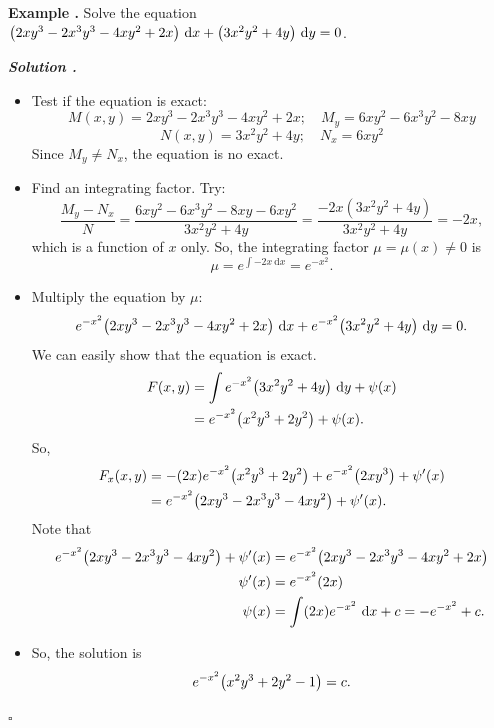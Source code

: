 \documentclass[12pt, a4paper]{article}
\newcounter{index}[subsection]
\newenvironment*{eg}{\begin{framed}\par\noindent\textbf{Example \thesubsection.\stepcounter{index}\theindex}}{\par\end{framed}}
\newcounter{nprf}[subsection]
\newenvironment*{sol}{\par\indent\textbf{\textit{Solution \stepcounter{nprf}\thenprf.}}\par}{\hfill{$\square$}\par}
\def\d{{\mathrm{d}}}
\begin{document}
\begin{eg}
	Solve the equation $\qty(2xy^3-2x^3y^3-4xy^2+2x)\ \d{x}+\qty(3x^2y^2+4y)\ \d{y}=0$.
	\begin{sol}
		\begin{itemize}
			\item Test if the equation is exact: \[M(x,y)=2xy^3-2x^3y^3-4xy^2+2x;\quad M_y=6xy^2-6x^3y^2-8xy\]\[N(x,y)=3x^2y^2+4y;\quad N_x=6xy^2\] Since $M_y\neq N_x$, the equation is no exact.
			\item Find an integrating factor. Try: \[\dfrac{M_y-N_x}{N}=\dfrac{6xy^2-6x^3y^2-8xy-6xy^2}{3x^2y^2+4y}=\dfrac{-2x(3x^2y^2+4y)}{3x^2y^2+4y}=-2x,\] which is a function of $x$ only. So, the integrating factor $\mu=\mu(x)\neq0$ is \[\mu=e^{\int-2x\ \d{x}}=e^{-x^2}.\]
			\item Multiply the equation by $\mu$: \[e^{-x^2}\qty(2xy^3-2x^3y^3-4xy^2+2x)\ \d{x}+e^{-x^2}\qty(3x^2y^2+4y)\ \d{y}=0.\] We can easily show that the equation is exact. \begin{align*}F(x,y)&=\int e^{-x^2}\qty(3x^2y^2+4y)\ \d{y}+\psi(x)\\&=e^{-x^2}\qty(x^2y^3+2y^2)+\psi(x).\end{align*} So, \begin{align*}F_x(x,y)&=-(2x)e^{-x^2}\qty(x^2y^3+2y^2)+e^{-x^2}\qty(2xy^3)+\psi'(x)\\&=e^{-x^2}\qty(2xy^3-2x^3y^3-4xy^2)+\psi'(x).\end{align*} Note that \begin{align*}e^{-x^2}\qty(2xy^3-2x^3y^3-4xy^2)+\psi'(x)&=e^{-x^2}\qty(2xy^3-2x^3y^3-4xy^2+2x)\\\psi'(x)&=e^{-x^2}\qty(2x)\\\psi(x)&=\int(2x)e^{-x^2}\ \d{x}+c=-e^{-x^2}+c.\end{align*}
			\item So, the solution is \[e^{-x^2}\qty(x^2y^3+2y^2-1)=c.\]
		\end{itemize}
	\end{sol}
\end{eg}
\end{document}
